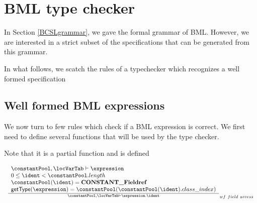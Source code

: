 
\newcommand{\getType}{\mbox{\rm\textsf{getType}}}
\newcommand{\getClassName}{\mbox{\rm\textsf{getClassName}}} 
\section{BML type checker}
In Section \ref{BCSLgrammar}, we gave the formal grammar of BML.
However, we are interested in a strict subset of 
the specifications that can be generated from this grammar.

In what follows, we scatch the rules of a typechecker which 
recognizes a well formed specification

\subsection{Well formed BML expressions}
We now turn to few rules which check if a BML expression is correct.
We first need to define several functions that will be used by the type checker.


Note that it is a partial function and is defined 
 


$$\begin{array}{l}
  \frac{ \begin{array}{l}
          \constantPool , \locVarTab \vdash   \expression \\
	   0 \le \ident < \constantPool.length \\
	  \constantPool(\ident ) = \mbox{\rm\textbf{CONSTANT\_Fieldref}}  \\   
	   \getType(\expression) =  \constantPool ( \constantPool (\ident).class\_index )   
	 \end{array} 
  }{ \constantPool , \locVarTab \vdash \expression.\ident  }_{wf \ field \ access}
\end{array}
$$

     
